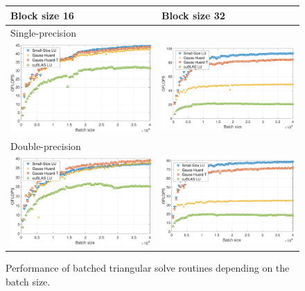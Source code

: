 \begin{figure}
\begin{center}
\begin{tabular}{ll}
Block size 16 & Block size 32\\
\hline
Single-precision\\
\includegraphics[width=.45\columnwidth]{plots/trsv_sgebjp_setup__lu_gje_gh_16.pdf}
&
\includegraphics[width=.45\columnwidth]{plots/trsv_sgebjp_setup__lu_gje_gh_32.pdf}\\
\hline
Double-precision\\
\includegraphics[width=.45\columnwidth]{plots/trsv_dgebjp_setup__lu_gje_gh_16.pdf}
&
\includegraphics[width=.45\columnwidth]{plots/trsv_dgebjp_setup__lu_gje_gh_32.pdf}
\end{tabular}
\end{center}
\caption{%
Performance of batched triangular solve routines depending on the batch size.
}
\label{2017-lu-block-jacobi:fig:performancetrsv}
\end{figure}


